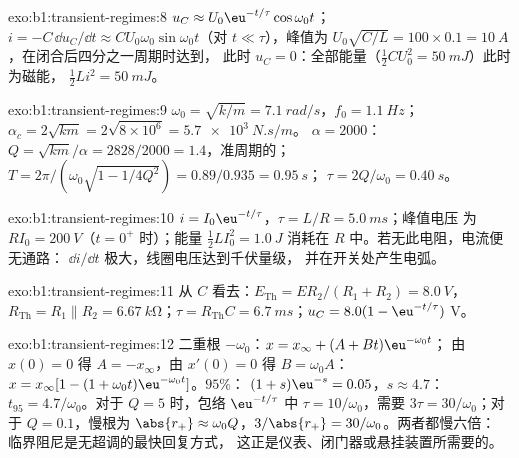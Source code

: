 \begin{solution}{exo:b1:transient-regimes:8}
$u_C \approx U_0\eu^{-t/\tau}\cos\omega_0 t$；$i = -C\,\dd u_C/\dd t
\approx CU_0\omega_0\sin\omega_0 t$（对 $t \ll \tau$），峰值为 $U_0\sqrt{C/L}
= 100 \times 0.1 = \qty{10}{A}$，在闭合后四分之一周期时达到，
此时 $u_C = 0$：全部能量（$\tfrac12 CU_0^2 = \qty{50}{mJ}$）此时为磁能，
$\tfrac12 Li^2 = \qty{50}{mJ}$。
\end{solution}

\begin{solution}{exo:b1:transient-regimes:9}
$\omega_0 = \sqrt{k/m} = \qty{7.1}{rad/s}$，$f_0 = \qty{1.1}{Hz}$；
$\alpha_c = 2\sqrt{km} = 2\sqrt{8\times10^6} = \qty{5.7e3}{N.s/m}$。
$\alpha = 2000$：$Q = \sqrt{km}/\alpha = 2828/2000 = 1.4$，准周期的；
$T = 2\pi/(\omega_0\sqrt{1 - 1/4Q^2}) = 0.89/0.935 = \qty{0.95}{s}$；
$\tau = 2Q/\omega_0 = \qty{0.40}{s}$。
\end{solution}

\begin{solution}{exo:b1:transient-regimes:10}
$i = I_0\eu^{-t/\tau}$，$\tau = L/R = \qty{5.0}{ms}$；峰值电压
为 $RI_0 = \qty{200}{V}$（$t = 0^+$ 时）；能量 $\tfrac12 LI_0^2 = \qty{1.0}{J}$
消耗在 $R$ 中。若无此电阻，电流便无通路：
$\dd i/\dd t$ 极大，线圈电压达到千伏量级，
并在开关处产生电弧。
\end{solution}

\begin{solution}{exo:b1:transient-regimes:11}
从 $C$ 看去：$E_{\mathrm{Th}} = ER_2/(R_1 + R_2) = \qty{8.0}{V}$，
$R_{\mathrm{Th}} = R_1 \parallel R_2 = \qty{6.67}{k\ohm}$；$\tau =
R_{\mathrm{Th}}C = \qty{6.7}{ms}$；$u_C = 8.0(1 - \eu^{-t/\tau})$ V。
\end{solution}

\begin{solution}{exo:b1:transient-regimes:12}
二重根 $-\omega_0$：$x = x_\infty + (A + Bt)\eu^{-\omega_0 t}$；
由 $x(0) = 0$ 得 $A = -x_\infty$，由 $x'(0) = 0$ 得 $B = \omega_0 A$：
$x = x_\infty[1 - (1 + \omega_0 t)\eu^{-\omega_0 t}]$。$95\%$：
$(1 + s)\eu^{-s} = 0.05$，$s \approx 4.7$：$t_{95} = 4.7/\omega_0$。对于
$Q = 5$ 时，包络 $\eu^{-t/\tau}$ 中 $\tau = 10/\omega_0$，需要
$3\tau = 30/\omega_0$；对于 $Q = 0.1$，慢根为 $\abs{r_+} \approx
\omega_0 Q$，$3/\abs{r_+} = 30/\omega_0$。两者都慢六倍：
临界阻尼是无超调的最快回复方式，
这正是仪表、闭门器或悬挂装置所需要的。
\end{solution}

